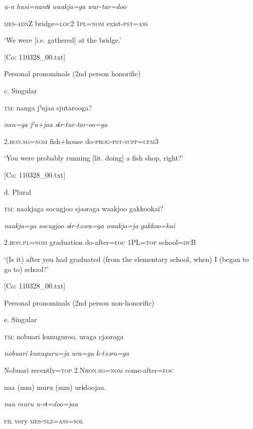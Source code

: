       \textit{u-n}  \textit{hasi=nantɨ}  \textit{waakja=ga}  \textit{wur-tar=doo}

      \textsc{mes}-\textsc{adn}Z  bridge=\textsc{loc}2  1\textsc{pl}=\textsc{nom}  exist-\textsc{pst}=\textsc{ass}

      ‘We were [i.e. gathered] at the bridge.’

      [Co: 110328\_00.txt]

  Personal pronominals (2nd person honorific)

  c.  Singular

    \textsc{tm}:  nanga  jˀujaa  sjutarooga?

      \textit{nan=ga}  \textit{jˀu+jaa}  \textit{sɨr-tur-tar-oo=ga}

      2.\textsc{hon}.\textsc{sg}=\textsc{nom}  fish+house  do-\textsc{prog}-\textsc{pst}-\textsc{supp}=\textsc{cfm}3

      ‘You were probably running [lit. doing] a fish shop, right?’

      [Co: 110328\_00.txt]

  d.  Plural

    \textsc{tm}:  naakjaga  {\textbar}socugjoo{\textbar}  sjəəraga  waakjoo  {\textbar}gakkoo{\textbar}kai?

      \textit{naakja=ga}  \textit{socugjoo}  \textit{sɨr-təəra=ga}  \textit{waakja=ja}  \textit{gakkoo=kai}

      2.\textsc{hon}.\textsc{pl}=\textsc{nom}  graduation  do-after=\textsc{foc}  1PL=\textsc{top}  school=\textsc{du}B

      ‘(Is it) after you had graduated (from the elementary school, when) I (began to go to) school?’

      [Co: 110328\_00.txt]

  Personal pronominals (2nd person non-honorific)

  e.  Singular

    \textsc{tm}:  nobuari  kunuguroo,  uraga  cjəəraga

      \textit{nobuari}  \textit{kunuguru=ja}  \textit{ura=ga}  \textit{k-təəra=ga}

      Nobuari  recently=\textsc{top}  2.N\textsc{hon}.\textsc{sg}=\textsc{nom}  come-after=\textsc{foc}

      naa  (mm)  muru  (mm)  urɨdoojaa.

      \textit{naa}    \textit{muru}    \textit{u-rɨ=doo=jaa}

      \textsc{fil}    very    \textsc{mes}-\textsc{nlz}=\textsc{ass}=\textsc{sol}

